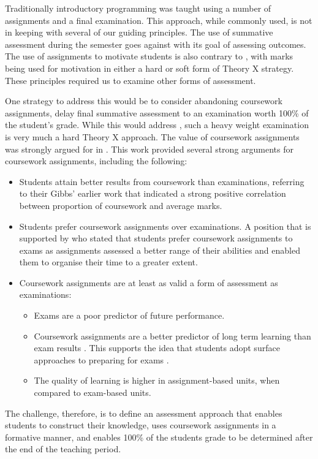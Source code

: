 Traditionally introductory programming was taught using a number of assignments and a final examination. This approach, while commonly used, is not in keeping with several of our guiding principles. The use of summative assessment during the semester goes against  with its goal of assessing outcomes. The use of assignments to motivate students is also contrary to , with marks being used for motivation in either a hard or soft form of Theory X strategy. These principles required us to examine other forms of assessment.

One strategy to address this would be to consider abandoning coursework assignments, delay final summative assessment to an examination worth 100\% of the student's grade. While this would address , such a heavy weight examination is very much a hard Theory X approach. The value of coursework assignments was strongly argued for in \citet{Gibbs:2004}. This work provided several strong arguments for coursework assignments, including the following:
\begin{itemize}[noitemsep,nolistsep]
	\item Students attain better results from coursework than examinations, referring to their Gibbs' earlier work that indicated a strong positive correlation between proportion of coursework and average marks.
	\item Students prefer coursework assignments over examinations. A position that is supported by \citet{Kniveton:1996} who stated that students prefer coursework assignments to exams as assignments assessed a better range of their abilities and enabled them to organise their time to a greater extent.
	\item Coursework assignments are at least as valid a form of assessment as examinations:
	\begin{itemize}
		\item Exams are a poor predictor of future performance.
		\item Coursework assignments are a better predictor of long term learning than exam results \cite{Conway:1992}. This supports the idea that students adopt surface approaches to preparing for exams \citet{Marton:1976a}. 
		\item The quality of learning is higher in assignment-based units, when compared to exam-based units.
	\end{itemize}
\end{itemize}

The challenge, therefore, is to define an assessment approach that enables students to construct their knowledge, uses coursework assignments in a formative manner, and enables 100\% of the students grade to be determined after the end of the teaching period.

